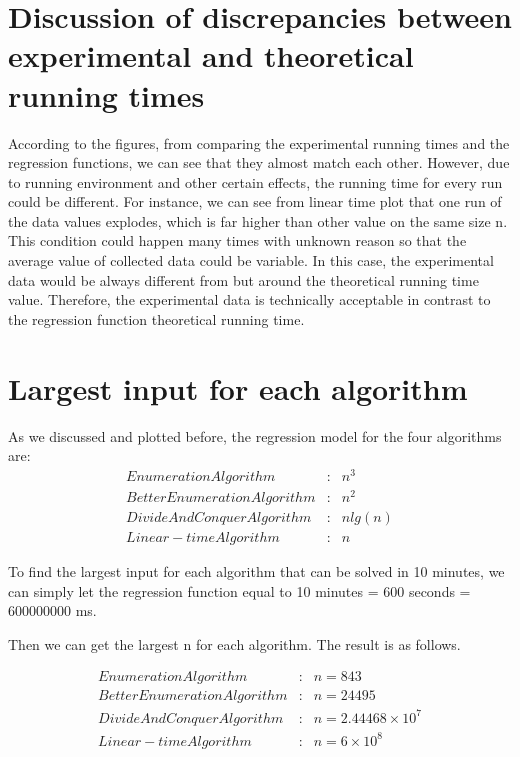 \documentclass[11pt]{scrreprt}
\begin{document}
\section{Discussion of discrepancies between experimental and theoretical running times}

According to the figures, from comparing the experimental running times and the regression functions, we can see that they almost match each other. However, due to running environment and other certain effects, the running time for every run could be different. For instance, we can see from linear time plot that one run of the data values explodes, which is far higher than other value on the same size n. This condition could happen many times with unknown reason so that the average value of collected data could be variable. In this case, the experimental data would be always different from but around the theoretical running time value. Therefore, the experimental data is technically acceptable in contrast to the regression function theoretical running time. 

\section{Largest input for each algorithm}

As we discussed and plotted before, the regression model for the four algorithms are:
\begin{eqnarray*}
Enumeration Algorithm&:& n^3\\
Better Enumeration Algorithm&:& n^2\\
Divide And Conquer Algorithm&:& nlg(n)\\
Linear-time Algorithm&:& n
\end{eqnarray*}

To find the largest input for each algorithm that can be solved in 10 minutes, we can simply let the regression function equal to 10 minutes = 600 seconds = 600000000 ms.

Then we can get the largest n for each algorithm. The result is as follows.

\begin{eqnarray*}
Enumeration Algorithm&:& n = 843\\
Better Enumeration Algorithm&:& n = 24495\\
Divide And Conquer Algorithm&:& n = 2.44468\times10^7\\
Linear-time Algorithm&:& n = 6\times10^8
\end{eqnarray*}
\end{document}
